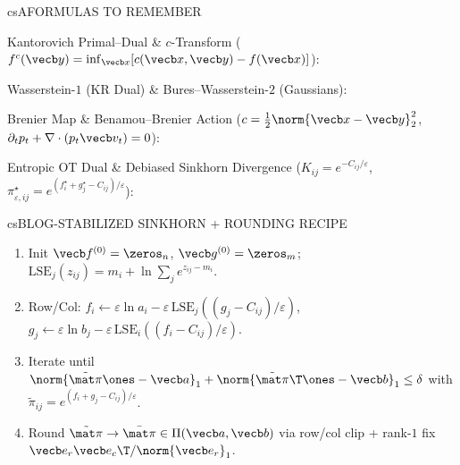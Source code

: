 \documentclass[../../../../master.tex]{subfiles}
\begin{document}
\begin{cscolumns}
\begin{cscard}{csA}{FORMULAS TO REMEMBER}
  \begin{csbul}
    \item Kantorovich Primal--Dual \& $c$-Transform ($f^c(\vecb y)=\inf_{\vecb x}[c(\vecb x,\vecb y)-f(\vecb x)]$):
    \item Wasserstein-$1$ (KR Dual) \& Bures--Wasserstein-$2$ (Gaussians):
    \item Brenier Map \& Benamou--Brenier Action ($c=\frac12\norm{\vecb x-\vecb y}_2^2$, $\partial_t p_t+\nabla\cdot(p_t\vecb v_t)=0$):
    \item Entropic OT Dual \& Debiased Sinkhorn Divergence ($K_{ij}=e^{-C_{ij}/\varepsilon}$, $\pi_{\varepsilon,ij}^\star=e^{(f_i^\star+g_j^\star-C_{ij})/\varepsilon}$):
  \end{csbul}
\end{cscard}

\begin{cscard}{csB}{LOG-STABILIZED SINKHORN + ROUNDING RECIPE}
  \begin{enumerate}[leftmargin=1.2em, itemsep=1pt, topsep=1pt, parsep=0pt]
    \item Init $\vecb f^{(0)}=\zeros_n$, $\vecb g^{(0)}=\zeros_m$; $\mathrm{LSE}_j(z_{ij})=m_i+\ln\sum_j e^{z_{ij}-m_i}$.
    \item Row/Col: $f_i\leftarrow\varepsilon\ln a_i-\varepsilon\,\mathrm{LSE}_j((g_j\!-\!C_{ij})/\varepsilon)$, $g_j\leftarrow\varepsilon\ln b_j-\varepsilon\,\mathrm{LSE}_i((f_i\!-\!C_{ij})/\varepsilon)$.
    \item Iterate until $\norm{\tilde{\mat\pi}\ones-\vecb a}_1+\norm{\tilde{\mat\pi}\T\ones-\vecb b}_1\le\delta$ with $\tilde\pi_{ij}=e^{(f_i+g_j-C_{ij})/\varepsilon}$.
    \item Round $\tilde{\mat\pi}\to\bar{\mat\pi}\in\Pi(\vecb a,\vecb b)$ via row/col clip + rank-$1$ fix $\vecb e_r\vecb e_c\T/\norm{\vecb e_r}_1$.
  \end{enumerate}
\end{cscard}
\columnbreak


\end{cscolumns}
\end{document}
